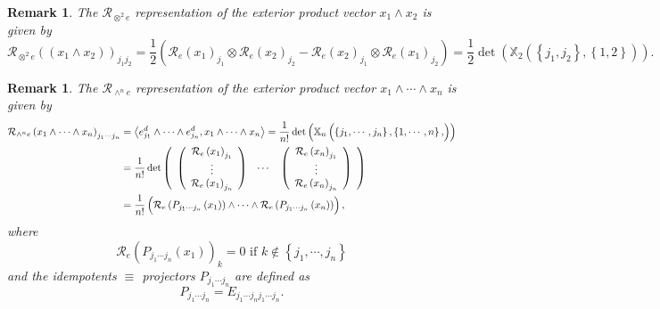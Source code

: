 \documentclass[aps,preprint]{revtex4}%
\newtheorem{remark}[theorem]{Remark}
\begin{document}
\begin{remark}
The $\mathcal{R}_{\otimes^{2}e}$ representation of the exterior product vector
$x_{1}\wedge x_{2}$ is given by
\begin{equation}
\mathcal{R}_{\otimes^{2}e}\left(  \left(  x_{1}\wedge x_{2}\right)  \right)
_{j_{1}j_{2}}=\frac{1}{2}\left(  \mathcal{R}_{e}\left(  x_{1}\right)  _{j_{1}%
}\otimes\mathcal{R}_{e}\left(  x_{2}\right)  _{j_{2}}-\mathcal{R}_{e}\left(
x_{2}\right)  _{j_{1}}\otimes\mathcal{R}_{e}\left(  x_{1}\right)  _{j_{2}%
}\right)  =\frac{1}{2}\det\left(  \mathbb{X}_{2}\left(  \left\{  j_{1}%
,j_{2}\right\}  ,\left\{  1,2\right\}  \right)  \right)  .
\end{equation}

\end{remark}

\begin{remark}
The $\mathcal{R}_{\wedge^{n}e}$ representation of the exterior product vector
$x_{1}\wedge\cdots\wedge x_{n}$ is given by
\begin{align}
\mathcal{R}_{\wedge^{n}e}\left(  x_{1}\wedge\cdots\wedge x_{n}\right)
_{j_{1}\cdots j_{n}}  &  =\left\langle e_{j_{1}}^{d}\wedge\cdots\wedge
e_{j_{n}}^{d},x_{1}\wedge\cdots\wedge x_{n}\right\rangle =\frac{1}{n!}%
\det\left(  \mathbb{X}_{n}\left(  \left\{  j_{1},\cdots,j_{n}\right\}
,\overset{}{\left\{  1,\cdots,n\right\}  ,}\right)  \right) \\
&  =\frac{1}{n!}\det\left(
\begin{array}
[c]{ccc}%
\left(
\begin{array}
[c]{c}%
\mathcal{R}_{e}\left(  x_{1}\right)  _{j_{1}}\\
\vdots\\
\mathcal{R}_{e}\left(  x_{1}\right)  _{j_{n}}%
\end{array}
\right)  & \cdots & \left(
\begin{array}
[c]{c}%
\mathcal{R}_{e}\left(  x_{n}\right)  _{j_{1}}\\
\vdots\\
\mathcal{R}_{e}\left(  x_{n}\right)  _{j_{n}}%
\end{array}
\right)
\end{array}
\right) \\
&  =\frac{1}{n!}\left(  \overset{}{\mathcal{R}_{e}\left(  P_{j_{1}\cdots
j_{n}}\left(  x_{1}\right)  \right)  \wedge\cdots\wedge\mathcal{R}_{e}\left(
P_{j_{1}\cdots j_{n}}\left(  x_{n}\right)  \right)  }\right)  ,
\end{align}
where
\begin{equation}
\mathcal{R}_{e}\left(  P_{j_{1}\cdots j_{n}}\left(  x_{1}\right)  \right)
_{k}=0\text{ if }k\notin\left\{  j_{1},\cdots,j_{n}\right\}
\end{equation}
and the idempotents $\equiv$ projectors $P_{j_{1}\cdots j_{n}}$ are defined
as
\begin{equation}
P_{j_{1}\cdots j_{n}}=E_{j_{1}\cdots j_{n}j_{1}\cdots j_{n}}.
\end{equation}

\end{remark}
\end{document}
